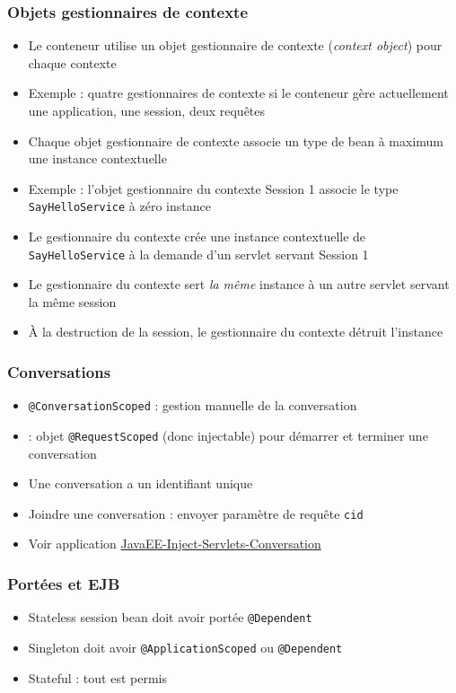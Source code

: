 \documentclass[english, french]{beamer}
\begin{document}
\begin{frame}
	\frametitle{Objets gestionnaires de contexte}
	\begin{itemize}
		\item Le conteneur utilise un objet gestionnaire de contexte (\emph{context object}) pour chaque contexte
		\item Exemple : quatre gestionnaires de contexte si le conteneur gère actuellement une application, une session, deux requêtes
		\item Chaque objet gestionnaire de contexte associe un type de bean à maximum une instance contextuelle
		\item Exemple : l’objet gestionnaire du contexte \og{}Session 1\fg{} associe le type \texttt{SayHelloService} à zéro instance
		\item Le gestionnaire du contexte crée une instance contextuelle de \texttt{SayHelloService} à la demande d’un servlet servant \og{}Session 1\fg{}
		\item Le gestionnaire du contexte sert \emph{la même} instance à un autre servlet servant la même session
		\item À la destruction de la session, le gestionnaire du contexte détruit l’instance
	\end{itemize}
\end{frame}

\begin{frame}
	\frametitle{Conversations}
	\begin{itemize}
		\item \texttt{@ConversationScoped} : gestion manuelle de la conversation
		\item {} : objet \texttt{@RequestScoped} (donc injectable) pour démarrer et terminer une conversation
		\item Une conversation a un identifiant unique
		\item Joindre une conversation : envoyer paramètre de requête \texttt{cid}
		\item Voir application \href{https://github.com/oliviercailloux/samples/tree/master/JavaEE-Inject-Servlets-Conversation}{JavaEE-Inject-Servlets-Conversation}
	\end{itemize}
\end{frame}

\begin{frame}
	\frametitle{Portées et EJB}
	\begin{itemize}
		\item Stateless session bean doit avoir portée \texttt{@Dependent}
		\item Singleton doit avoir \texttt{@ApplicationScoped} {\tiny ou \texttt{@Dependent}}
		\item Stateful : tout est permis
	\end{itemize}
\end{frame}
\end{document}
